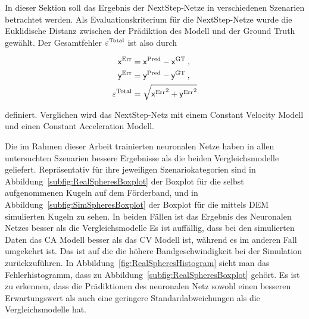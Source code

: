 



In dieser Sektion soll das Ergebnis der NextStep-Netze in verschiedenen Szenarien betrachtet werden.
Als Evaluationskriterium für die NextStep-Netze wurde die Euklidische Distanz zwischen der Prädiktion des Modell und der Ground Truth gewählt.
Der Gesamtfehler \(\varepsilon{^{\text{Total}}} \) ist also durch 

\begin{align*}
    \mathsf{x}{^{\text{Err}}} &=  \mathsf{x}{^{\text{Pred}}} -  \mathsf{x}{^{\text{GT}}} \: ,\\
    \mathsf{y}{^{\text{Err}}} &=  \mathsf{y}{^{\text{Pred}}} -  \mathsf{y}{^{\text{GT}}} \: ,\\
    \varepsilon{^{\text{Total}}} &= \sqrt{ \mathsf{x}{^{\text{Err}}}^2 +  \mathsf{y}{^{\text{Err}}}^2}
\end{align*}

definiert. Verglichen wird das NextStep-Netz mit einem Constant Velocity Modell und einen Constant Acceleration Modell.

Die im Rahmen dieser Arbeit trainierten neuronalen Netze haben in allen untersuchten Szenarien bessere Ergebnisse als die beiden Vergleichsmodelle geliefert.
Repräsentativ für ihre jeweiligen Szenariokategorien sind in Abbildung~\ref{subfig:RealSpheresBoxplot} der Boxplot für die selbst aufgenommenen Kugeln auf dem Förderband,
und in Abbildung~\ref{subfig:SimSpheresBoxplot} der Boxplot für die mittels DEM simulierten Kugeln zu sehen.
In beiden Fällen ist das Ergebnis des Neuronalen Netzes besser als die Vergleichsmodelle
Es ist auffällig, dass bei den simulierten Daten das CA Modell besser als das CV Modell ist, während es im anderen Fall umgekehrt ist.
Das ist auf die die höhere Bandgeschwindigkeit bei der Simulation zurückzuführen. 
In Abbildung~\ref{fig:RealSpheresHistogram} sieht man das Fehlerhistogramm, dass zu Abbildung~\ref{subfig:RealSpheresBoxplot} gehört.
Es ist zu erkennen, dass die Prädiktionen des neuronalen Netz sowohl einen besseren Erwartungswert als auch eine geringere Standardabweichungen als die Vergleichsmodelle hat.


